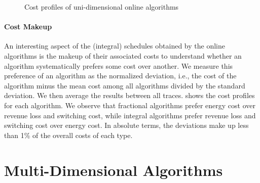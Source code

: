 \begin{figure}
    \centering
    
    \caption{Cost profiles of uni-dimensional online algorithms}\label{fig:case_studies:ud:costs}
\end{figure}

\paragraph{Cost Makeup} An interesting aspect of the (integral) schedules obtained by the online algorithms is the makeup of their associated costs to understand whether an algorithm systematically prefers some cost over another. We measure this preference of an algorithm as the normalized deviation, i.e., the cost of the algorithm minus the mean cost among all algorithms divided by the standard deviation. We then average the results between all traces.  shows the cost profiles for each algorithm. We observe that fractional algorithms prefer energy cost over revenue loss and switching cost, while integral algorithms prefer revenue loss and switching cost over energy cost. In absolute terms, the deviations make up less than 1\% of the overall costs of each type.

\section{Multi-Dimensional Algorithms}
